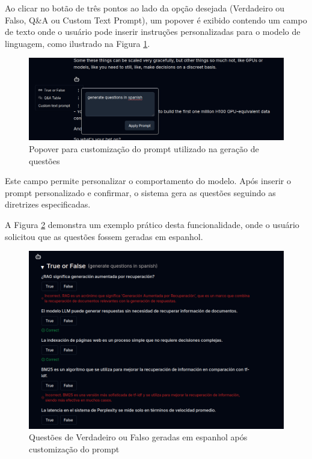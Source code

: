 \documentclass[tcc,capa]{texufpel}
\begin{document}
Ao clicar no botão de três pontos ao lado da opção desejada (Verdadeiro ou Falso, Q\&A ou Custom Text Prompt), um popover é exibido contendo um campo de texto onde o usuário pode inserir instruções personalizadas para o modelo de linguagem, como ilustrado na Figura \ref{fig:custom_prompt}.

\begin{figure}[H]
\centering
\includegraphics[width=\textwidth,height=0.45\textheight,keepaspectratio]{exemplo-slides/graphics/images/quizzes/customizar-prompt.png}
\caption{Popover para customização do prompt utilizado na geração de questões}
\label{fig:custom_prompt}
\end{figure}

Este campo permite personalizar o comportamento do modelo. Após inserir o prompt personalizado e confirmar, o sistema gera as questões seguindo as diretrizes especificadas.

A Figura \ref{fig:spanish_questions} demonstra um exemplo prático desta funcionalidade, onde o usuário solicitou que as questões fossem geradas em espanhol. 

\begin{figure}[H]
\centering
\includegraphics[width=\textwidth,height=0.45\textheight,keepaspectratio]{exemplo-slides/graphics/images/quizzes/generated-spanish-questions.png}
\caption{Questões de Verdadeiro ou Falso geradas em espanhol após customização do prompt}
\label{fig:spanish_questions}
\end{figure}
\end{document}
